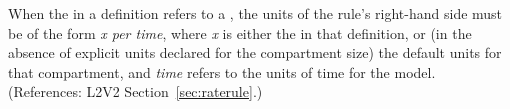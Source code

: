 When the  in a \RateRule definition refers to a
\Compartment, the units of the rule's right-hand side must be of the form
\emph{x per time}, where \emph{x} is either the  in that
\Compartment definition, or (in the absence of explicit units declared for
the compartment size) the default units for that compartment, and
\emph{time} refers to the units of time for the model.  (References: L2V2
Section~\ref{sec:raterule}.)
